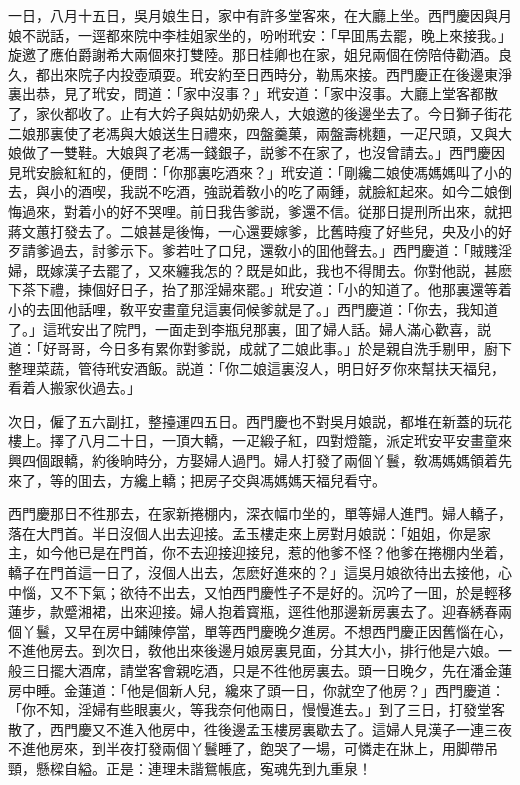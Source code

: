 一日，八月十五日，吳月娘生日，家中有許多堂客來，在大廳上坐。西門慶因與月娘不説話，一逕都來院中李桂姐家坐的，吩咐玳安：「早囬馬去罷，晚上來接我。」旋邀了應伯爵謝希大兩個來打雙陸。那日桂卿也在家，姐兒兩個在傍陪侍勸酒。良久，都出來院子内投壺頑耍。玳安約至日西時分，勒馬來接。西門慶正在後邊東淨裏出恭，見了玳安，問道：「家中沒事？」玳安道：「家中沒事。大廳上堂客都散了，家伙都收了。止有大妗子與姑奶奶衆人，大娘邀的後邊坐去了。今日獅子街花二娘那裏使了老馮與大娘送生日禮來，四盤羹菓，兩盤壽桃麵，一疋尺頭，又與大娘做了一雙鞋。大娘與了老馮一錢銀子，説爹不在家了，也沒曾請去。」西門慶因見玳安臉紅紅的，便問：「你那裏吃酒來？」玳安道：「剛纔二娘使馮媽媽叫了小的去，與小的酒喫，我説不吃酒，強説着敎小的吃了兩鍾，就臉紅起來。如今二娘倒悔過來，對着小的好不哭哩。前日我告爹説，爹還不信。従那日提刑所出來，就把蔣文蕙打發去了。二娘甚是後悔，一心還要嫁爹，比舊時瘦了好些兒，央及小的好歹請爹過去，討爹示下。爹若吐了口兒，還敎小的囬他聲去。」西門慶道：「賊賤淫婦，既嫁漢子去罷了，又來纏我怎的？既是如此，我也不得閒去。你對他説，甚麽下茶下禮，揀個好日子，抬了那淫婦來罷。」玳安道：「小的知道了。他那裏還等着小的去囬他話哩，敎平安畫童兒這裏伺候爹就是了。」西門慶道：「你去，我知道了。」這玳安出了院門，一面走到李瓶兒那裏，囬了婦人話。婦人滿心歡喜，説道：「好哥哥，今日多有累你對爹説，成就了二娘此事。」於是親自洗手剔甲，廚下整理菜蔬，管待玳安酒飯。説道：「你二娘這裏沒人，明日好歹你來幫扶天福兒，看着人搬家伙過去。」

次日，僱了五六副扛，整擡運四五日。西門慶也不對吳月娘説，都堆在新蓋的玩花樓上。擇了八月二十日，一頂大轎，一疋緞子紅，四對燈籠，派定玳安平安畫童來興四個跟轎，約後晌時分，方娶婦人過門。婦人打發了兩個丫鬟，敎馮媽媽領着先來了，等的囬去，方纔上轎；把房子交與馮媽媽天福兒看守。

西門慶那日不徃那去，在家新捲棚内，深衣幅巾坐的，單等婦人進門。婦人轎子，落在大門首。半日沒個人出去迎接。孟玉樓走來上房對月娘説：「姐姐，你是家主，如今他已是在門首，你不去迎接迎接兒，惹的他爹不怪？他爹在捲棚内坐着，轎子在門首這一日了，沒個人出去，怎麽好進來的？」這吳月娘欲待出去接他，心中惱，又不下氣；欲待不出去，又怕西門慶性子不是好的。沉吟了一囬，於是輕移蓮步，款蹙湘裙，出來迎接。婦人抱着寳瓶，逕徃他那邊新房裏去了。迎春綉春兩個丫鬟，又早在房中鋪陳停當，單等西門慶晚夕進房。不想西門慶正因舊惱在心，不進他房去。到次日，敎他出來後邊月娘房裏見面，分其大小，排行他是六娘。一般三日擺大酒席，請堂客會親吃酒，只是不徃他房裏去。頭一日晚夕，先在潘金蓮房中睡。金蓮道：「他是個新人兒，纔來了頭一日，你就空了他房？」西門慶道：「你不知，淫婦有些眼裏火，等我奈何他兩日，慢慢進去。」到了三日，打發堂客散了，西門慶又不進入他房中，徃後邊孟玉樓房裏歇去了。這婦人見漢子一連三夜不進他房來，到半夜打發兩個丫鬟睡了，飽哭了一場，可憐走在牀上，用脚帶吊頸，懸樑自縊。正是：連理未諧鴛帳底，寃魂先到九重泉！

